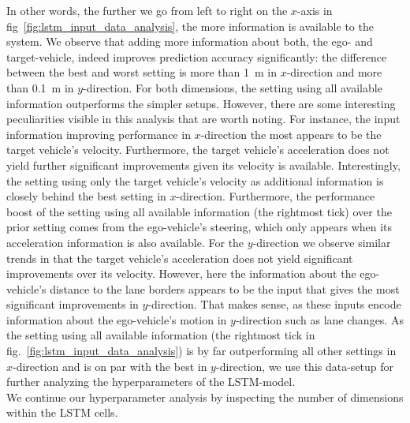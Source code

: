 In other words, the further we go from left to right on the $x$-axis in fig~\ref{fig:lstm_input_data_analysis}, the more information is available to the system.
We observe that adding more information about both, the ego- and target-vehicle, indeed improves prediction accuracy significantly: the difference between the best and worst setting is more than \SI{1}{\meter} in $x$-direction and more than \SI{0.1}{\meter} in $y$-direction.
For both dimensions, the setting using all available information outperforms the simpler setups.
However, there are some interesting peculiarities visible in this analysis that are worth noting.
For instance, the input information improving performance in $x$-direction the most appears to be the target vehicle's velocity. 
Furthermore, the target vehicle's acceleration does not yield further significant improvements given its velocity is available.
Interestingly, the setting using only the target vehicle's velocity as additional information is closely behind the best setting in $x$-direction.
Furthermore, the performance boost of the setting using all available information (the rightmost tick) over the prior setting comes from the ego-vehicle's steering, which only appears when its acceleration information is also available.
For the $y$-direction we observe similar trends in that the target vehicle's acceleration does not yield significant improvements over its velocity.
However, here the information about the ego-vehicle's distance to the lane borders appears to be the input that gives the most significant improvements in $y$-direction.
That makes sense, as these inputs encode information about the ego-vehicle's motion in $y$-direction such as lane changes.
As the setting using all available information (the rightmost tick in fig.~\ref{fig:lstm_input_data_analysis}) is by far outperforming all other settings in $x$-direction and is on par with the best in $y$-direction, we use this data-setup for further analyzing the hyperparameters of the \ac{LSTM}-model.
\\
We continue our hyperparameter analysis by inspecting the number of dimensions within the \ac{LSTM} cells.
